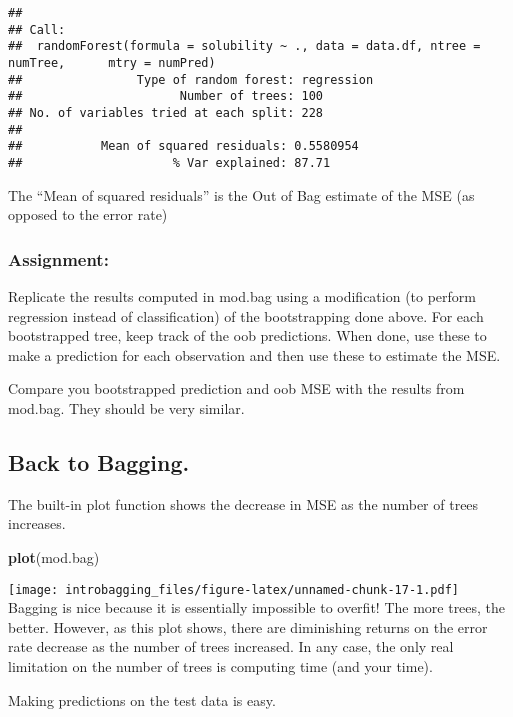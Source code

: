 \documentclass[]{article}
\newenvironment{Shaded}{\begin{snugshade}}{\end{snugshade}}
\newcommand{\KeywordTok}[1]{\textcolor[rgb]{0.13,0.29,0.53}{\textbf{#1}}}
\newcommand{\NormalTok}[1]{#1}
\begin{document}
\begin{verbatim}
## 
## Call:
##  randomForest(formula = solubility ~ ., data = data.df, ntree = numTree,      mtry = numPred) 
##                Type of random forest: regression
##                      Number of trees: 100
## No. of variables tried at each split: 228
## 
##           Mean of squared residuals: 0.5580954
##                     % Var explained: 87.71
\end{verbatim}

The ``Mean of squared residuals'' is the Out of Bag estimate of the MSE
(as opposed to the error rate)

\hypertarget{assignment-1}{%
\subsubsection{Assignment:}\label{assignment-1}}

Replicate the results computed in mod.bag using a modification (to
perform regression instead of classification) of the bootstrapping done
above. For each bootstrapped tree, keep track of the oob predictions.
When done, use these to make a prediction for each observation and then
use these to estimate the MSE.

Compare you bootstrapped prediction and oob MSE with the results from
mod.bag. They should be very similar.

\hypertarget{back-to-bagging.}{%
\subsection{Back to Bagging.}\label{back-to-bagging.}}

The built-in plot function shows the decrease in MSE as the number of
trees increases.

\begin{Shaded}
\begin{Highlighting}[]
\KeywordTok{plot}\NormalTok{(mod.bag)}
\end{Highlighting}
\end{Shaded}

\texttt{[image: introbagging\_files/figure-latex/unnamed-chunk-17-1.pdf]}
Bagging is nice because it is essentially impossible to overfit! The
more trees, the better. However, as this plot shows, there are
diminishing returns on the error rate decrease as the number of trees
increased. In any case, the only real limitation on the number of trees
is computing time (and your time).

Making predictions on the test data is easy.
\end{document}
